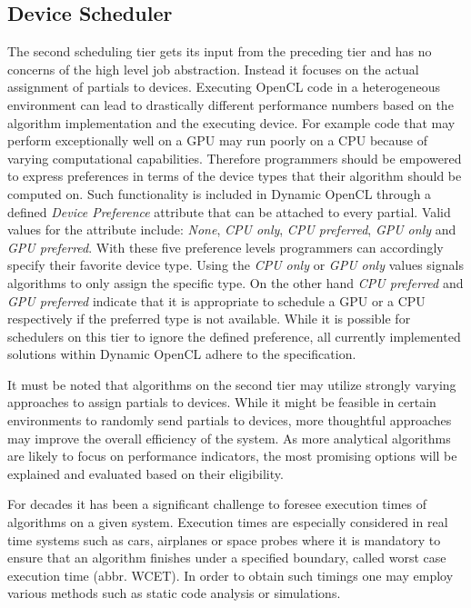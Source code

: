 \subsection{Device Scheduler}
The second scheduling tier gets its input from the preceding tier and has no concerns of the high level job abstraction. Instead it focuses on the actual assignment of partials to devices. Executing OpenCL code in a heterogeneous environment can lead to drastically different performance numbers based on the algorithm implementation and the executing device. For example code that may perform exceptionally well on a GPU may run poorly on a CPU because of varying computational capabilities. Therefore programmers should be empowered to express preferences in terms of the device types that their algorithm should be computed on. Such functionality is included in Dynamic OpenCL through a defined \textit{Device Preference} attribute that can be attached to every partial. Valid values for the attribute include: \textit{None}, \textit{CPU only}, \textit{CPU preferred}, \textit{GPU only} and \textit{GPU preferred}. With these five preference levels programmers can accordingly specify their favorite device type. Using the \textit{CPU only} or \textit{GPU only} values signals algorithms to only assign the specific type. On the other hand \textit{CPU preferred} and \textit{GPU preferred} indicate that it is appropriate to schedule a GPU or a CPU respectively if the preferred type is not available. While it is possible for schedulers on this tier to ignore the defined preference, all currently implemented solutions within Dynamic OpenCL adhere to the specification.

It must be noted that algorithms on the second tier may utilize strongly varying approaches to assign partials to devices. While it might be feasible in certain environments to randomly send partials to devices, more thoughtful approaches may improve the overall efficiency of the system. As more analytical algorithms are likely to focus on performance indicators, the most promising options will be explained and evaluated based on their eligibility.

For decades it has been a significant challenge to foresee execution times of algorithms on a given system. Execution times are especially considered in real time systems such as cars, airplanes or space probes where it is mandatory to ensure that an algorithm finishes under a specified boundary, called worst case execution time (abbr. WCET). In order to obtain such timings one may employ various methods such as static code analysis or simulations\cite{wcet}.

